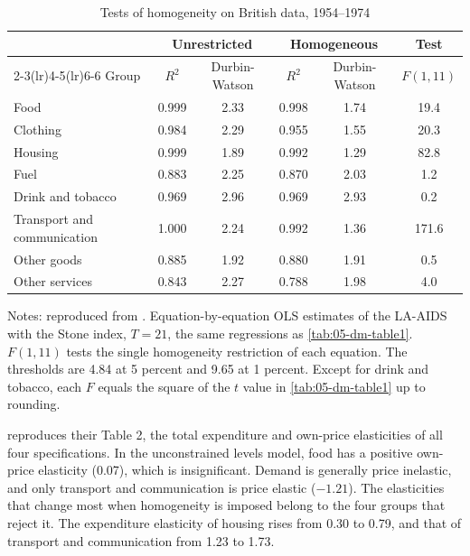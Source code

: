 \begin{table}[htbp]
\centering
\caption{Tests of homogeneity on British data, 1954--1974}
\label{tab:05-dm-homog}
\small
\begin{tabular}{lccccc}
\toprule
 & \multicolumn{2}{c}{Unrestricted} & \multicolumn{2}{c}{Homogeneous} & Test \\
\cmidrule(lr){2-3}\cmidrule(lr){4-5}\cmidrule(lr){6-6}
Group & $R^2$ & Durbin-Watson & $R^2$ & Durbin-Watson & $F(1, 11)$ \\
\midrule
Food & 0.999 & 2.33 & 0.998 & 1.74 & 19.4 \\
Clothing & 0.984 & 2.29 & 0.955 & 1.55 & 20.3 \\
Housing & 0.999 & 1.89 & 0.992 & 1.29 & 82.8 \\
Fuel & 0.883 & 2.25 & 0.870 & 2.03 & 1.2 \\
Drink and tobacco & 0.969 & 2.96 & 0.969 & 2.93 & 0.2 \\
Transport and communication & 1.000 & 2.24 & 0.992 & 1.36 & 171.6 \\
Other goods & 0.885 & 1.92 & 0.880 & 1.91 & 0.5 \\
Other services & 0.843 & 2.27 & 0.788 & 1.98 & 4.0 \\
\bottomrule
\end{tabular}

\smallskip
\begin{minipage}{0.94\textwidth}
\footnotesize Notes: reproduced from \citet[Table~3.4, p.~78]{DeatonMuellbauer1980b}. Equation-by-equation
OLS estimates of the LA-AIDS with the Stone index, $T = 21$, the same regressions as
\cref{tab:05-dm-table1}. $F(1, 11)$ tests the single homogeneity restriction of each equation. The
thresholds are 4.84 at 5 percent and 9.65 at 1 percent. Except for drink and tobacco, each $F$ equals the
square of the $t$ value in \cref{tab:05-dm-table1} up to rounding.
\end{minipage}
\end{table}

 reproduces their Table 2, the total expenditure and own-price elasticities of
all four specifications. In the unconstrained levels model, food has a positive own-price elasticity
(0.07), which is insignificant. Demand is generally price inelastic, and only transport and
communication is price elastic ($-1.21$). The elasticities that change most when homogeneity is imposed
belong to the four groups that reject it. The expenditure elasticity of housing rises from 0.30 to 0.79,
and that of transport and communication from 1.23 to 1.73.

